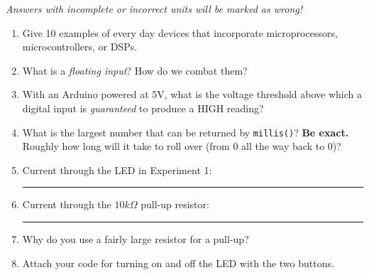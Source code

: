 \documentclass[11pt]{article} %
\begin{document}
\emph{Answers with incomplete or incorrect units will be marked as wrong!}

\begin{enumerate}

\item Give 10 examples of every day devices that incorporate microprocessors, microcontrollers, or DSPs.
\vspace{1.75in}
\vspace{1in}
\item What is a \emph{floating input}? How do we combat them?
\vspace{1in}
\item With an Arduino powered at 5V, what is the voltage threshold above which a digital input is \emph{guaranteed} to produce a HIGH reading?
\vspace{0.5in}
\item What is the largest number that can be returned by \verb|millis()|? {\bf Be exact.} Roughly how long will it take to roll over (from 0 all the way back to 0)?
\vspace{0.25in}
%
%
\item Current through the LED in Experiment 1: \rule{2in}{0.4pt}
\vspace{0.25in}
\item Current through the $10k\Omega$ pull-up resistor: \rule{2in}{0.4pt}
\vspace{0.25in}
\item Why do you use a fairly large resistor for a pull-up? 
\vspace{0.25in}


\item Attach your code for turning on and off the LED with the two buttons.
\end{enumerate}
\end{document}
